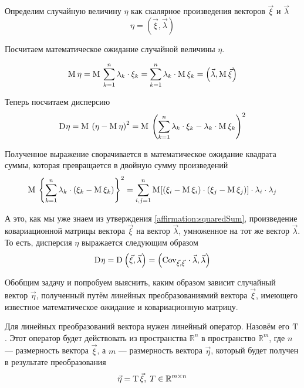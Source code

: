 Определим случайную величину $\eta$ как скалярное произведения векторов
$\vec{\xi}$ и $\vec{\lambda}$
$$\eta = \left( \vec{\xi}, \vec{\lambda} \right)$$

Посчитаем математическое ожидание случайной величины $\eta$.

\begin{equation}\label{eq:scalarMulMean}
    \mathrm{M}_{}\,\eta
        = \mathrm{M}_{}\,\sum_{k=1}^{n} \lambda_k \cdot \xi_k
        = \sum_{k=1}^{n} \lambda_k \cdot \mathrm{M}_{}\,\xi_k
        = \left( \vec{\lambda}, \mathrm{M}_{}\,\vec{\xi} \right)
\end{equation}

Теперь посчитаем дисперсию
$$\mathrm{D}_{} \eta
    = \mathrm{M}_{}\,\left( \eta - \mathrm{M}_{}\,\eta \right)^2
    = \mathrm{M}_{}\,\left( \sum_{k=1}^{n} \lambda_k \cdot \xi_k
        - \lambda_k \cdot \mathrm{M}_{}\,\xi_k \right)^2$$

Полученное выражение сворачивается в математическое ожидание квадрата суммы,
которая превращается в двойную сумму произведений
$$\mathrm{M}_{}\,\left\{ \sum_{k=1}^{n} \lambda_k
    \cdot \left( \xi_k - \mathrm{M}_{}\,\xi_k \right) \right\}^2
    = \sum_{i,j=1}^{n}\mathrm{M}_{}\!\left[ \left( \xi_i - \mathrm{M}_{}\,\xi_i \right)
            \cdot \left( \xi_j - \mathrm{M}_{}\,\xi_j \right) \right]
        \cdot \lambda_i \cdot \lambda_j$$

А это, как мы уже знаем из утверждения \ref{affirmation:squaredSum},
произведение ковариационной матрицы вектора $\vec{\xi}$
на вектор $\vec{\lambda}$, умноженное на тот же вектор $\vec{\lambda}$.
То есть, дисперсия $\eta$ выражается следующим образом
\begin{equation}\label{eq:linearQuadraticForm}
\mathrm{D}_{} \eta
    = \mathrm{D}_{} \left( \vec{\xi}, \vec{\lambda} \right)
    = \left( \mathrm{Cov}_{\vec{\xi}, \vec{\xi}}\, \cdot \vec{\lambda}, \vec{\lambda} \right)
\end{equation}

Обобщим задачу и попробуем выяснить, каким образом зависит случайный вектор
$\vec{\eta}$, полученный путём линейных преобразованиямий вектора $\vec{\xi}$,
имеющего известное математическое ожидание и ковариационную матрицу.

Для линейных преобразований вектора нужен линейный оператор. Назовём его
$\mathrm{T}$. Этот оператор будет действовать из пространства $\mathbb{R}^n$
в пространство $\mathbb{R}^m$, где $n$ --- размерность вектора $\vec{\xi}$,
а $m$ --- размерность вектора $\vec{\eta}$, который будет получен
в результате преобразования
$$\vec{\eta} = \mathrm{T}\, {\vec{\xi}},\; T \in \mathbb{R}^{m \times n}$$

